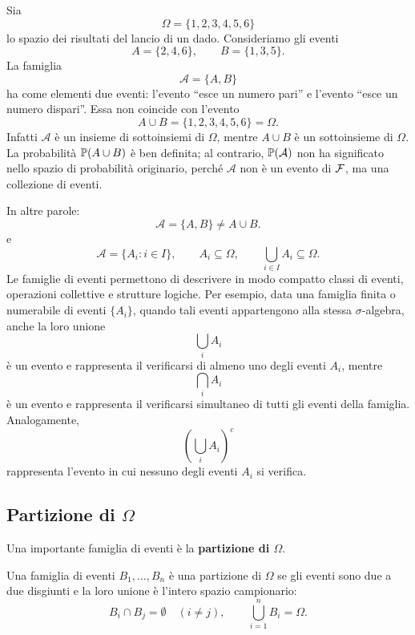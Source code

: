 \begin{example}
Sia
\[
\Omega=\{1,2,3,4,5,6\}
\]
lo spazio dei risultati del lancio di un dado. Consideriamo gli eventi
\[
A=\{2,4,6\},\qquad B=\{1,3,5\}.
\]
La famiglia
\[
\mathcal{A}=\{A,B\}
\]
ha come elementi due eventi: l'evento ``esce un numero pari'' e l'evento ``esce un numero dispari''. 
Essa non coincide con l'evento
\[
A\cup B=\{1,2,3,4,5,6\}=\Omega.
\]
Infatti \(\mathcal{A}\) \`{e} un insieme di sottoinsiemi di \(\Omega\), mentre \(A\cup B\) \`{e} un sottoinsieme di \(\Omega\). 
La probabilit\`{a} \(\mathbb{P}(A\cup B)\) \`{e} ben definita; al contrario, \(\mathbb{P}(\mathcal{A})\) non ha significato nello spazio di probabilit\`{a} originario, perch\'{e} \(\mathcal{A}\) non \`{e} un evento di \(\mathcal{F}\), ma una collezione di eventi.
\end{example}

In altre parole:
\[
\mathcal{A}=\{A,B\}\neq A\cup B.
\]
e
\[
\mathcal{A}=\{A_i:i\in I\},
\qquad
A_i\subseteq\Omega,
\qquad
\bigcup_{i\in I}A_i\subseteq\Omega.
\]
Le famiglie di eventi permettono di descrivere in modo compatto classi di eventi, operazioni collettive e strutture logiche. 
Per esempio, data una famiglia finita o numerabile di eventi
\(\{A_i\}\), quando tali eventi appartengono alla stessa $\sigma$-algebra,
anche la loro unione
\[
\bigcup_i A_i
\]
\`{e} un evento e rappresenta il verificarsi di almeno uno degli eventi
\(A_i\), mentre
\[
\bigcap_i A_i
\]
\`{e} un evento e rappresenta il verificarsi simultaneo di tutti gli eventi
della famiglia. Analogamente,
\[
\left(\bigcup_i A_i\right)^c
\]
rappresenta l'evento in cui nessuno degli eventi \(A_i\) si verifica.




\subsection{Partizione di $\Omega$}
Una importante famiglia di eventi \`{e} la \textbf{partizione di $\Omega$}.

\begin{definition}
Una famiglia di eventi $B_{1},\ldots,B_{n}$ \`{e} una partizione di $\Omega$
se gli eventi sono due a due disgiunti e la loro unione \`{e} l'intero spazio
campionario:
\[
B_{i}\cap B_{j}=\emptyset\quad(i\neq j),\qquad\bigcup_{i=1}^{n}B_{i}=\Omega.
\]

\end{definition}

